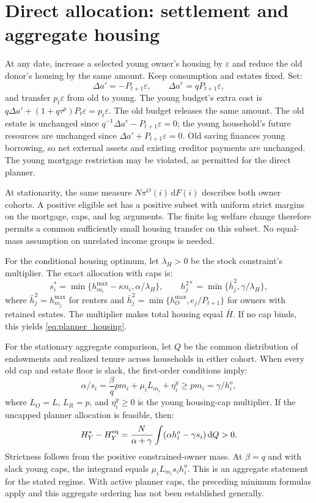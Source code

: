 \documentclass[11pt]{article}
\newcommand{\dd}{\mathrm d}
\begin{document}
\section{Direct allocation: settlement and aggregate housing}
\label{app:direct_settlement}

At any date, increase a selected young owner's housing by $\varepsilon$ and
reduce the old donor's housing by the same amount. Keep consumption and
estates fixed. Set:
\begin{equation}
\Delta a'=-P_{t+1}\varepsilon,\qquad
\Delta a^e=qP_{t+1}\varepsilon,
\end{equation}
and transfer $p_t\varepsilon$ from old to young. The young budget's extra
cost is $q\Delta a'+(1+q\tau^p)P_t\varepsilon=p_t\varepsilon$.
The old budget releases the same amount. The old estate is unchanged since
$q^{-1}\Delta a^e-P_{t+1}\varepsilon=0$; the young household's future
resources are unchanged since $\Delta a'+P_{t+1}\varepsilon=0$.
Old saving finances young borrowing, so net external assets and existing
creditor payments are unchanged. The young mortgage restriction may be
violated, as permitted for the direct planner.

At stationarity, the same measure $N\pi^O(i)\,\dd F(i)$ describes both
owner cohorts. A positive eligible set has a positive subset with uniform
strict margins on the mortgage, caps, and log arguments. The finite log
welfare change therefore permits a common sufficiently small housing
transfer on this subset. No equal-mass assumption on unrelated income
groups is needed.

For the conditional housing optimum, let $\lambda_H>0$ be the stock
constraint's multiplier. The exact allocation with caps is:
\begin{equation}
s_i^*=\min\{h_{m_i}^{\max}-\kappa n_i,\alpha/\lambda_H\},
\qquad h_j^{2*}=\min\{\bar h_j^2,\gamma/\lambda_H\},
\end{equation}
where $\bar h_j^2=h_{m_j}^{\max}$ for renters and
$\bar h_j^2=\min\{h_O^{\max},e_j/P_{t+1}\}$ for owners with retained
estates. The multiplier makes total housing equal $\bar H$.
If no cap binds, this yields \eqref{eq:planner_housing}.

For the stationary aggregate comparison, let $Q$ be the common distribution
of endowments and realized tenure across households in either cohort. When every old
cap and estate floor is slack, the first-order conditions imply:
\begin{equation}
\alpha/s_i=\frac\beta q pm_i+\mu_iL_{m_i}+\eta_i^y
\ge pm_i=\gamma/h_i^o,
\end{equation}
where $L_O=L$, $L_R=p$, and $\eta_i^y\ge0$ is the young housing-cap
multiplier. If the uncapped planner allocation is feasible, then:
\begin{equation}
H_Y^*-H_Y^{\rm eq}=
\frac N{\alpha+\gamma}\int(\alpha h_i^o-\gamma s_i)\,\mathrm dQ>0.
\end{equation}
Strictness follows from the positive constrained-owner mass. At $\beta=q$
and with slack young caps, the integrand equals $\mu_iL_{m_i}s_i h_i^o$.
This is an aggregate statement for the stated regime. With active planner
caps, the preceding minimum formulas apply and this aggregate ordering has
not been established generally.
\end{document}

